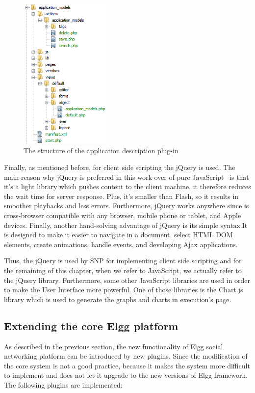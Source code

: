 \begin{figure}[h]
	\centering
	\includegraphics[width=0.4\textwidth]{./fig/folder_hierarchy.png}
	\caption{The structure of the application description plug-in}
	\label{fig:elgg_hierarchy}
\end{figure}

Finally, as mentioned before, for client side scripting the jQuery is used. The main reason why jQuery is preferred in this work over of pure JavaScript~\cite{mccormick2004jquery} is that it's a light library which pushes content to the client machine, it therefore reduces the wait time for server response. Plus, it's smaller than Flash, so it results in smoother playbacks and less errors. Furthermore, jQuery works anywhere since is cross-browser compatible with any browser, mobile phone or tablet, and Apple devices. Finally, another hand-solving advantage of jQuery is its simple syntax.It is designed to make it easier to navigate in a document, select HTML DOM elements, create animations, handle events, and developing Ajax applications. 

Thus, the jQuery is used by SNP for implementing client side scripting and for the remaining of this chapter, when we refer to JavaScript, we actually refer to the jQuery library. 
Furthermore, some other JavaScript libraries are used in order to make the User Interface more powerful. One of those libraries is the Chart.js~\cite{chartjs_url} library which is used to generate the graphs and charts in execution's page.

\subsection{Extending the core Elgg platform}
As described in the previous section, the new functionality of Elgg social networking platform can be introduced by new plugins. Since the modification of the core system is not a good practice, because it makes the system more difficult to implement and does not let it upgrade to the new versions of Elgg framework. The following plugins are implemented:


